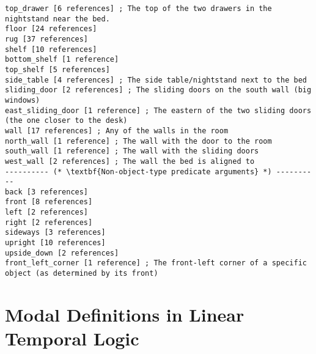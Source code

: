 \documentclass{article}
\begin{document}
\begin{lstlisting}
top_drawer [6 references] ; The top of the two drawers in the nightstand near the bed.
floor [24 references] 
rug [37 references] 
shelf [10 references] 
bottom_shelf [1 reference] 
top_shelf [5 references] 
side_table [4 references] ; The side table/nightstand next to the bed
sliding_door [2 references] ; The sliding doors on the south wall (big windows)
east_sliding_door [1 reference] ; The eastern of the two sliding doors (the one closer to the desk)
wall [17 references] ; Any of the walls in the room
north_wall [1 reference] ; The wall with the door to the room
south_wall [1 reference] ; The wall with the sliding doors
west_wall [2 references] ; The wall the bed is aligned to
---------- (* \textbf{Non-object-type predicate arguments} *) ----------
back [3 references] 
front [8 references] 
left [2 references] 
right [2 references] 
sideways [3 references] 
upright [10 references] 
upside_down [2 references] 
front_left_corner [1 reference] ; The front-left corner of a specific object (as determined by its front)
\end{lstlisting}




\section{Modal Definitions in Linear Temporal Logic}
\end{document}
